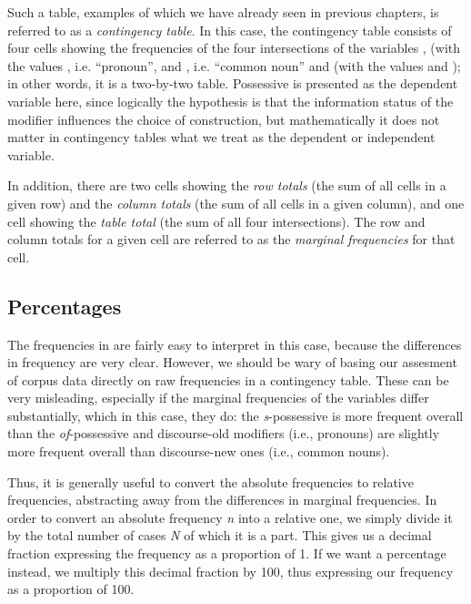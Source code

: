 Such a table, examples of which we have already seen in previous chapters, is referred to as a \textit{contingency table}.  In this case, the contingency table consists of four cells showing the frequencies  of the four intersections of the variables ,  (with the values , i.e. ``pronoun'',  and , i.e. ``common noun''  and   (with the values  and ); in other words, it is a two\hyp{}by\hyp{}two table. Possessive is presented as the dependent variable here, since logically the hypothesis  is that the information status of the modifier influences the choice of construction, but mathematically it does not matter in contingency  tables what we treat as the dependent or independent variable.

In addition, there are two cells showing the \textit{row totals} (the sum of all cells in a given row) and the \textit{column totals} (the sum of all cells in a given column), and one cell showing the \textit{table total} (the sum of all four intersections). The row and column totals for a given cell are referred to as the \textit{marginal frequencies}  for that cell.

\subsection{Percentages}
\label{sec:percentages}

The frequencies  in  are fairly easy to interpret in this case, because the differences in frequency are very clear. However, we should be wary of basing our assesment of corpus data directly on raw frequencies in a contingency  table. These can be very misleading, especially if the marginal frequencies  of the variables differ substantially, which in this case, they do: the \textit{s}-possessive  is more frequent overall than the \textit{of}-possessive and discourse\hyp{}old modifiers (i.e., pronouns)  are slightly more frequent overall than discourse\hyp{}new ones (i.e., common  nouns).

Thus, it is generally useful to convert the absolute frequencies  to relative frequencies, abstracting away from the differences in marginal frequencies. In order to convert an absolute frequency \textit{n} into a relative one, we simply divide it by the total number of cases \textit{N} of which it is a part. This gives us a decimal fraction expressing the frequency  as a proportion of 1. If we want a percentage instead, we multiply this decimal fraction by 100, thus expressing our frequency as a proportion of 100.


